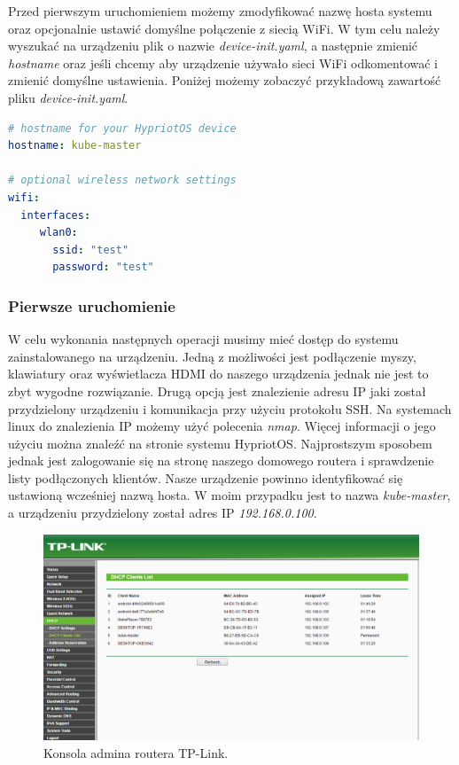 \documentclass[12pt]{report}
\let\Oldsubsubsection\subsubsection
\renewcommand{\subsubsection}{\FloatBarrier\Oldsubsubsection}
\begin{document}
{Przed pierwszym uruchomieniem możemy zmodyfikować nazwę hosta systemu oraz opcjonalnie ustawić domyślne połączenie z siecią WiFi. W tym celu należy wyszukać na urządzeniu plik o nazwie \textit{device-init.yaml}, a następnie zmienić \textit{hostname} oraz jeśli chcemy aby urządzenie używało sieci WiFi odkomentować i zmienić domyślne ustawienia. Poniżej możemy zobaczyć przykładową zawartość pliku \textit{device-init.yaml}.

\begin{lstlisting}[language=yaml]
# hostname for your HypriotOS device
hostname: kube-master

# optional wireless network settings
wifi:
  interfaces:
     wlan0:
       ssid: "test"
       password: "test"
\end{lstlisting}

\subsubsection{Pierwsze uruchomienie}
W celu wykonania następnych operacji musimy mieć dostęp do systemu zainstalowanego na urządzeniu. Jedną z możliwości jest podłączenie myszy, klawiatury oraz wyświetlacza HDMI do naszego urządzenia jednak nie jest to zbyt wygodne rozwiązanie. Drugą opcją jest znalezienie adresu IP jaki został przydzielony urządzeniu i komunikacja przy użyciu protokołu SSH. Na systemach linux do znalezienia IP możemy użyć polecenia \textit{nmap}. Więcej informacji o jego użyciu można znaleźć na stronie systemu HypriotOS. Najprostszym sposobem jednak jest zalogowanie się na stronę naszego domowego routera i sprawdzenie listy podłączonych klientów. Nasze urządzenie powinno identyfikować się ustawioną wcześniej nazwą hosta. W moim przypadku jest to nazwa \textit{kube-master}, a urządzeniu przydzielony został adres IP \textit{192.168.0.100}.

\begin{figure}[h]
	\centering
	\includegraphics[width=1\textwidth]{images/tp-link-console.png}
	\caption{Konsola admina routera TP-Link.}
\end{figure}
\FloatBarrier

}
\end{document}
